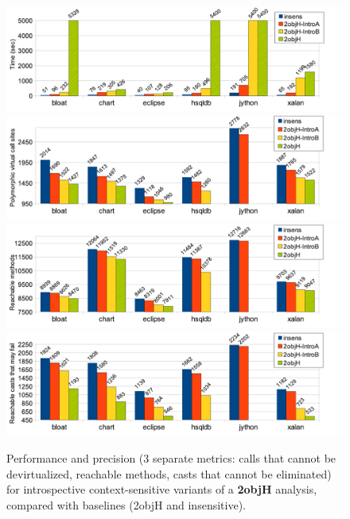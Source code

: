 \begin{figure}[h!tp]
\begin{center}
\includegraphics[scale=0.54]{assets/introspective/2objHtime.pdf} \\
\includegraphics[scale=0.54]{assets/introspective/2objHvcalls.pdf} \\
\includegraphics[scale=0.54]{assets/introspective/2objHmeths.pdf} \\
\includegraphics[scale=0.54]{assets/introspective/2objHcasts.pdf}
\end{center}
\caption[Performance and precision of introspective variants of a 2objH analysis]{Performance and precision (3 separate metrics: calls that cannot be devirtualized, reachable methods, casts that cannot be eliminated) for introspective context-sensitive variants of a \textbf{2objH} analysis, compared with baselines (2objH and insensitive).}
\label{fig:introspect:2objH-chart}
\end{figure}


